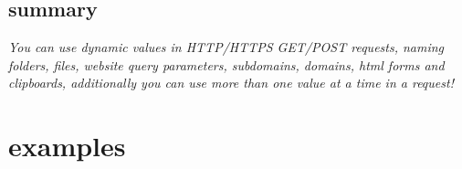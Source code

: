 \documentclass{article}
\begin{document}
\subsection{summary}
\textit{You can use dynamic values in HTTP/HTTPS GET/POST requests, naming folders, files, website query parameters, subdomains, domains, html forms and clipboards, additionally you can use more than one value at a time in a request!}
\section{examples}
\end{document}
